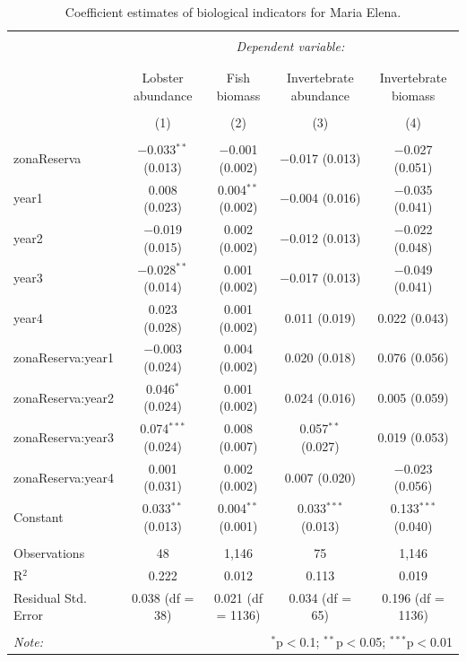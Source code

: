 \documentclass[utf8]{frontiers_suppmat} %
\begin{document}
\begin{table}[!htbp] \centering 
  \caption{Coefficient estimates of biological indicators for Maria Elena.} 
  \label{} 
\tiny 
\begin{tabular}{@{\extracolsep{1pt}}lcccc} 
\\[-1.8ex]\hline 
\hline \\[-1.8ex] 
 & \multicolumn{4}{c}{\textit{Dependent variable:}} \\ 
\cline{2-5} 
\\[-1.8ex] & \multicolumn{4}{c}{} \\ 
 & Lobster abundance & Fish biomass & Invertebrate abundance & Invertebrate biomass \\ 
\\[-1.8ex] & (1) & (2) & (3) & (4)\\ 
\hline \\[-1.8ex] 
 zonaReserva & $-$0.033$^{**}$ (0.013) & $-$0.001 (0.002) & $-$0.017 (0.013) & $-$0.027 (0.051) \\ 
  year1 & 0.008 (0.023) & 0.004$^{**}$ (0.002) & $-$0.004 (0.016) & $-$0.035 (0.041) \\ 
  year2 & $-$0.019 (0.015) & 0.002 (0.002) & $-$0.012 (0.013) & $-$0.022 (0.048) \\ 
  year3 & $-$0.028$^{**}$ (0.014) & 0.001 (0.002) & $-$0.017 (0.013) & $-$0.049 (0.041) \\ 
  year4 & 0.023 (0.028) & 0.001 (0.002) & 0.011 (0.019) & 0.022 (0.043) \\ 
  zonaReserva:year1 & $-$0.003 (0.024) & 0.004 (0.002) & 0.020 (0.018) & 0.076 (0.056) \\ 
  zonaReserva:year2 & 0.046$^{*}$ (0.024) & 0.001 (0.002) & 0.024 (0.016) & 0.005 (0.059) \\ 
  zonaReserva:year3 & 0.074$^{***}$ (0.024) & 0.008 (0.007) & 0.057$^{**}$ (0.027) & 0.019 (0.053) \\ 
  zonaReserva:year4 & 0.001 (0.031) & 0.002 (0.002) & 0.007 (0.020) & $-$0.023 (0.056) \\ 
  Constant & 0.033$^{**}$ (0.013) & 0.004$^{**}$ (0.001) & 0.033$^{***}$ (0.013) & 0.133$^{***}$ (0.040) \\ 
 \hline \\[-1.8ex] 
Observations & 48 & 1,146 & 75 & 1,146 \\ 
R$^{2}$ & 0.222 & 0.012 & 0.113 & 0.019 \\ 
Residual Std. Error & 0.038 (df = 38) & 0.021 (df = 1136) & 0.034 (df = 65) & 0.196 (df = 1136) \\ 
\hline 
\hline \\[-1.8ex] 
\textit{Note:}  & \multicolumn{4}{r}{$^{*}$p$<$0.1; $^{**}$p$<$0.05; $^{***}$p$<$0.01} \\ 
\end{tabular} 
\end{table}
\end{document}

